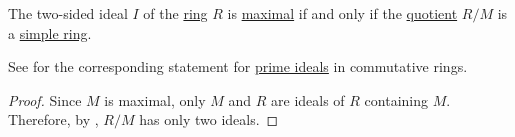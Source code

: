 \begin{corollary}\label{thm:quotient_by_maximal_ideal}
  The two-sided ideal \( I \) of the \hyperref[def:ring]{ring} \( R \) is \hyperref[def:semiring_ideal/maximal]{maximal} if and only if the \hyperref[def:ring/quotient]{quotient} \( R / M \) is a \hyperref[def:ring/simple]{simple ring}.

  See  for the corresponding statement for \hyperref[def:semiring_ideal/prime]{prime ideals} in commutative rings.
\end{corollary}
\begin{proof}
  Since \( M \) is maximal, only \( M \) and \( R \) are ideals of \( R \) containing \( M \). Therefore, by , \( R / M \) has only two ideals.
\end{proof}
